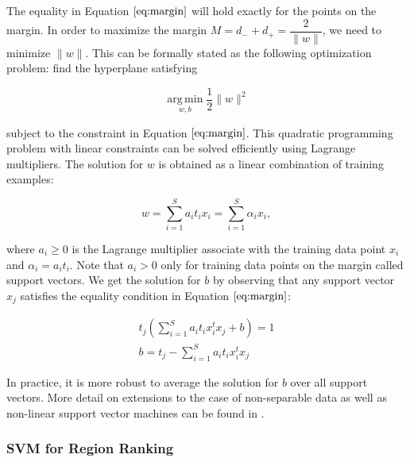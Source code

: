 \documentclass{SMBV12}
\begin{document}
The equality in Equation $\ref{eq:margin}$ will hold exactly for the points on the margin. In order to maximize the margin $M = d_- + d_+ = \dfrac{2}{\|w\|}$, we need to minimize $\|w\|$. This can be formally stated as the following optimization problem: find the hyperplane satisfying

\begin{equation}
\operatorname*{arg\,min}_{w, b} \dfrac{1}{2}\|w\|^2
\end{equation}

subject to the constraint in Equation $\ref{eq:margin}$. This quadratic programming problem with linear constraints can be solved efficiently using Lagrange multipliers. The solution for $w$ is obtained as a linear combination of training examples:

\begin{equation}
w = \sum\limits_{i = 1}^{S} a_i t_i x_i = \sum\limits_{i = 1}^{S} \alpha_ix_i,
\end{equation}

where $a_i \geq 0$ is the Lagrange multiplier associate with the training data point $x_i$ and $\alpha_i = a_it_i$. Note that $a_i > 0$ only for training data points on the margin called support vectors. We get the solution for $b$ by observing that any support vector $x_j$ satisfies the equality condition in Equation $\ref{eq:margin}$:

\begin{equation}
\begin{array}{lcl}
t_j \left( \sum\limits_{i = 1}^{S} a_i t_i x_i^t x_j + b \right) = 1\\
b = t_j - \sum\limits_{i = 1}^{S} a_i t_i x_i^t x_j
\end{array}
\end{equation}

In practice, it is more robust to average the solution for $b$ over all support vectors. More detail on extensions to the case of non-separable data as well as non-linear support vector machines can be found in \cite{burges1998tutorial}.



\subsubsection{SVM for Region Ranking}
\end{document}
